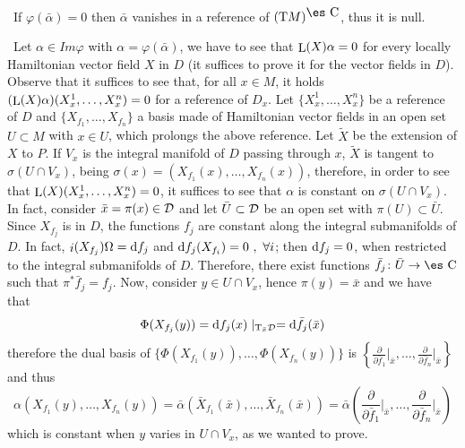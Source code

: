 \documentclass[12pt]{article}
\theoremstyle{plain}
\def\dst{\(}
\def\derpar#1#2{\frac{\partial{#1}}{\partial{#2}}}
\def\d{{\rm d}}
\def\Complex{\mbox{\es C}}
\def\inn{\mathop{i}\nolimits}
\def\Tan{{\rm T}}
\def\Lie{\mathop{\rm L}\nolimits}
\begin{document}
 \
If $\varphi (\bar \alpha )=0$ then $\bar \alpha$ vanishes
in a reference of $(\Tan M)^{\Complex}$, thus it is null.

 \
Let $\alpha \in Im \varphi$ with $\alpha = \varphi (\bar \alpha )$,
we have to see that $\Lie (X)\alpha = 0$
for every locally Hamiltonian vector field $X$ in $D$
(it suffices to prove it for the vector fields in $D$).
Observe that it suffices to see that, for all $x \in M$, it holds
$(\Lie(X)\alpha) (X_x^1, \ldots ,X_x^n)=0$ for a reference of $D_x$.
Let $\{X_x^1,\ldots ,X_x^n \}$ be a reference of $D$ and
$\{X_{f_1},\ldots ,X_{f_n} \}$
a basis made of Hamiltonian vector fields in an open set $U \subset M$
with $x \in U$,
which prolongs the above reference. Let $\tilde X$ be the extension of
$X$ to $P$.
If $V_x$ is the integral manifold of $D$
passing through $x$, $\tilde X$ is tangent to $\sigma (U\cap V_x)$,
being
$\sigma (x) = (X_{f_1}(x),\ldots ,X_{f_n}(x))$, therefore, in order to
see that
$\Lie(X)(X_x^1,\ldots ,X_x^n)=0$, it suffices to see that $\alpha$
is constant on $\sigma (U\cap V_x)$. In fact, consider
$\bar x = \pi (x) \in {\cal D}$ and let $\bar U \subset {\cal D}$ be an
open set
with $\pi (U) \subset \bar U$. Since $X_{f_j}$ is in $D$,
the functions $f_j$ are constant  along the integral submanifolds of
$D$.
In fact, $\inn(X_{f_j})\Omega = \d f_j$ and $\d f_j(X_{f_i})=0 \ , \
\forall i$;
then $\d f_j = 0$, when restricted to the integral submanifolds of $D$.
Therefore, there exist functions $\bar f_j \colon \bar U \to \Complex$
such that $\pi^* \bar f_j = f_j$. Now, consider $y \in U \cap V_x$,
hence $\pi (y) = \bar x$ and we have that
$$
\Phi (X_{f_j}(y)) = \d f_j(x)\mid_{\Tan_{\bar x}{\cal D}} =
\d \bar f_j(\bar x)
$$
therefore the dual basis of $\{ \Phi (X_{f_1}(y)), \ldots ,\Phi
(X_{f_n}(y)) \}$
is \dst\left\{ \derpar{}{\bar f_1}\Big\vert_{\bar x},\ldots
,\derpar{}{\bar f_n}\Big\vert_{\bar x}\right\} \)
and thus
$$
\alpha (X_{f_1}(y), \ldots ,X_{f_n}(y))=
\bar \alpha (\bar X_{f_1}(\bar x), \ldots ,\bar X_{f_n}(\bar x)) =
\bar \alpha \left(\derpar{}{\bar f_1}\Big\vert_{\bar x},\ldots ,
\derpar{}{\bar f_n}\Big\vert_{\bar x}\right)
$$
which is constant when $y$ varies in $U \cap V_x$, as we wanted to
prove.
\end{document}

